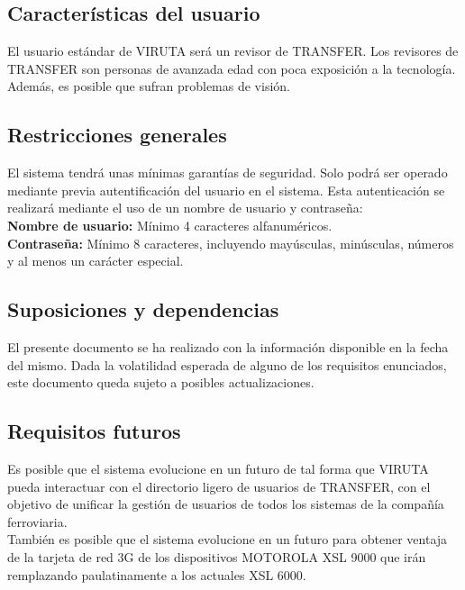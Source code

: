\subsection{Características del usuario}

El usuario estándar de VIRUTA será un revisor de TRANSFER. Los revisores de TRANSFER son personas de avanzada edad con poca exposición a la tecnología. Además, es posible que sufran problemas de visión.

\subsection{Restricciones generales}

El sistema tendrá unas mínimas garantías de seguridad. Solo podrá ser operado mediante previa autentificación del usuario en el sistema. Esta autenticación se realizará mediante el uso de un nombre de usuario y contraseña:\\

\textbf{Nombre de usuario:} Mínimo 4 caracteres alfanuméricos.\\

\textbf{Contraseña:} Mínimo 8 caracteres, incluyendo mayúsculas, minúsculas, números y al menos un carácter especial.

\subsection{Suposiciones y dependencias}

El presente documento se ha realizado con la información disponible en la fecha del mismo. Dada la volatilidad esperada de alguno de los requisitos enunciados, este documento queda sujeto a posibles actualizaciones.

\subsection{Requisitos futuros}

Es posible que el sistema evolucione en un futuro de tal forma que VIRUTA pueda interactuar con el directorio ligero de usuarios de TRANSFER, con el objetivo de unificar la gestión de usuarios de todos los sistemas de la compañía ferroviaria.\\

\color{red} También es posible que el sistema evolucione en un futuro para obtener ventaja de la tarjeta de red 3G de los dispositivos MOTOROLA XSL 9000 que irán remplazando paulatinamente a los actuales XSL 6000. \color{black}